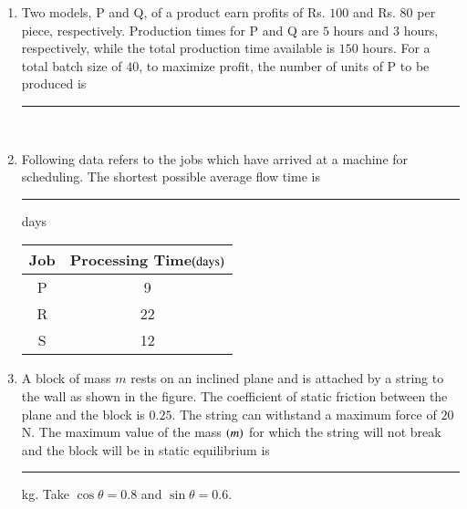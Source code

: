 \documentclass[journal]{IEEEtran}
\begin{document}
\begin{enumerate}
{\begin{figure}[H]
\label{fig:my_label}
\end{figure}
\begin{multicols}{4}
    \begin{enumerate}
        \item $5$
        \item $6.67$
        \item $10$
        \item $20$
    \end{enumerate}
\end{multicols}
}
\item{
Two models, P and Q, of a product earn profits of Rs. $100$ and Rs. $80$ per piece, respectively. Production times for P and Q are $5$ hours and $3$ hours, respectively, while the total production time available is $150$ hours. For a total batch size of $40$, to maximize profit, the number of units of P to be produced is \rule{2cm}{0.15mm}}\\
\item{
Following data refers to the jobs  which have arrived at a machine for scheduling. The shortest possible average flow time is \rule{2cm}{0.15mm} days
\begin{table}[H]
    \centering
    \begin{tabular}{|c|c|}
        \hline
         Job&Processing Time$\left(\text{days}\right)$  \\
         \hline
         P&9\\
         \hline
         R&22\\
         \hline
         S&12\\
         \hline
    \end{tabular}
    \label{tab:my_label}
\end{table}
}
\item{
    A block of mass $m$ rests on an inclined plane and is attached by a string to the wall as shown in the figure. The coefficient of static friction between the plane and the block is $0.25$. The string can withstand a maximum force of $20$ N. The maximum value of the mass $\left(m\right)$ for which the string will not break and the block will be in static equilibrium is \rule{3cm}{0.15mm}kg. Take $\cos\theta=0.8$ and $\sin\theta=0.6$.
\begin{figure}[H]
\centering
{}%


\end{figure}}
\end{enumerate}
\end{document}
